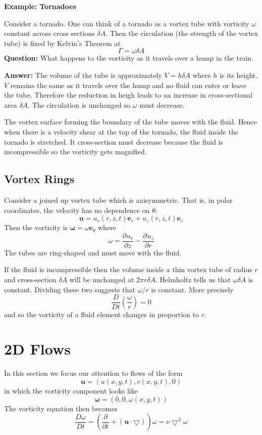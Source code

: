 \documentclass[11pt]{article}
\newcommand*{\pd}[3][]{\ensuremath{\frac{\partial^{#1} {#2}}{\partial {#3}^{#1}}}}
\newcommand*{\md}[1]{\ensuremath{\frac{D #1}{D t}}}
\newcommand{\grad}{\bigtriangledown}
\newcommand{\mv}[1]{\bm{#1}}
\newenvironment{eg}
{\begin{mdframed}[backgroundcolor=mylg, roundcorner=5pt, linewidth=0pt]\textbf{Example: }\normalfont}
    {\end{mdframed}}
\begin{document}
\begin{eg}
	\textbf{Tornadoes}

Consider a tornado.
One can think of a tornado as a vortex tube with vorticity $\omega$ constant across cross sections $\delta A$.
Then the circulation (the strength of the vortex tube) is fixed by Kelvin's Theorem at
\[
\Gamma = \omega \delta A
\]
\textbf{Question: }What happens to the vorticity as it travels over a hump in the train.

\textbf{Answer: }The volume of the tube is approximately $V= h \delta A$ where $h$ is its height.
$V$ remains the same as it travels over the hump and no fluid can enter or leave the tube.
Therefore the reduction in heigh leads to an increase in cross-sectional area $\delta A$.
The circulation is unchanged so $\omega$ must decrease.

The vortex surface forming the boundary of the tube moves with the fluid.
Hence when there is a velocity shear at the top of the tornado, the fluid inside the tornado is stretched.
It cross-section must decrease because the fluid is incompressible so the vorticity gets magnified.
\end{eg}

\subsection{Vortex Rings}
Consider a joined up vortex tube which is axisymmetric.
That is, in polar coordinates, the velocity has no dependence on $\theta$:
\[
	\mv{u}=u_r(r, z, t)\mv{e}_r + u_z(r, z, t)\mv{e}_z
\]
Then the vorticity is $\mv{\omega}=\omega \mv{e}_\theta$ where
\[
	\omega = \pd{u_r}{z}-\pd{u_z}{r}
\]
The tubes are ring-shaped and must move with the fluid.

If the fluid is incompressible then the volume inside a thin vortex tube of radius $r$ and cross-section $\delta A$ will be unchanged at $2\pi r \delta A$.
Helmholtz tells us that $\omega \delta A$ is constant.
Dividing these two suggests that $\omega / r$ is constant.
More precisely
\[
	\frac{D}{Dt}\left( \frac{\omega}{r}\right)=0
\]
and so the vorticity of a fluid element changes in proportion to $r$.

\section{2D Flows}
In this section we focus our attention to flows of the form
\[
	\mv{u} = (u (x, y, t), v(x, y, t), 0)
\]
in which the vorticity component looks like
\[
	\mv{\omega}=(0, 0, \omega(x, y, t))
\]
The vorticity equation then becomes
\[
	\md{\omega} = \left( \pd{}{t}+ (\mv{u} \cdot \grad) \right)\omega = \nu \grad^2 \omega
\]
\end{document}
